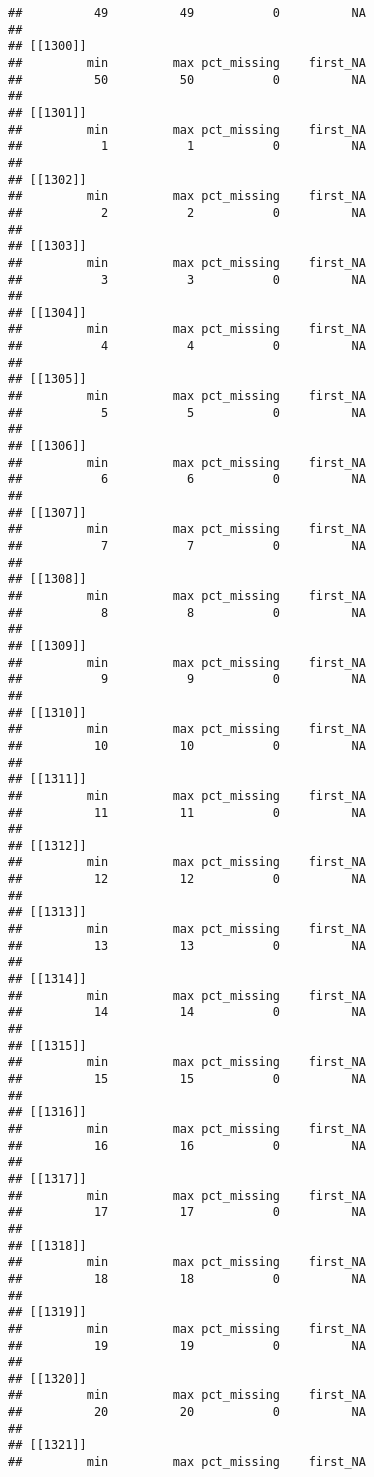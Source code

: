 \documentclass[
]{article}
\begin{document}
\begin{verbatim}
##          49          49           0          NA 
## 
## [[1300]]
##         min         max pct_missing    first_NA 
##          50          50           0          NA 
## 
## [[1301]]
##         min         max pct_missing    first_NA 
##           1           1           0          NA 
## 
## [[1302]]
##         min         max pct_missing    first_NA 
##           2           2           0          NA 
## 
## [[1303]]
##         min         max pct_missing    first_NA 
##           3           3           0          NA 
## 
## [[1304]]
##         min         max pct_missing    first_NA 
##           4           4           0          NA 
## 
## [[1305]]
##         min         max pct_missing    first_NA 
##           5           5           0          NA 
## 
## [[1306]]
##         min         max pct_missing    first_NA 
##           6           6           0          NA 
## 
## [[1307]]
##         min         max pct_missing    first_NA 
##           7           7           0          NA 
## 
## [[1308]]
##         min         max pct_missing    first_NA 
##           8           8           0          NA 
## 
## [[1309]]
##         min         max pct_missing    first_NA 
##           9           9           0          NA 
## 
## [[1310]]
##         min         max pct_missing    first_NA 
##          10          10           0          NA 
## 
## [[1311]]
##         min         max pct_missing    first_NA 
##          11          11           0          NA 
## 
## [[1312]]
##         min         max pct_missing    first_NA 
##          12          12           0          NA 
## 
## [[1313]]
##         min         max pct_missing    first_NA 
##          13          13           0          NA 
## 
## [[1314]]
##         min         max pct_missing    first_NA 
##          14          14           0          NA 
## 
## [[1315]]
##         min         max pct_missing    first_NA 
##          15          15           0          NA 
## 
## [[1316]]
##         min         max pct_missing    first_NA 
##          16          16           0          NA 
## 
## [[1317]]
##         min         max pct_missing    first_NA 
##          17          17           0          NA 
## 
## [[1318]]
##         min         max pct_missing    first_NA 
##          18          18           0          NA 
## 
## [[1319]]
##         min         max pct_missing    first_NA 
##          19          19           0          NA 
## 
## [[1320]]
##         min         max pct_missing    first_NA 
##          20          20           0          NA 
## 
## [[1321]]
##         min         max pct_missing    first_NA 

\end{verbatim}
\end{document}
